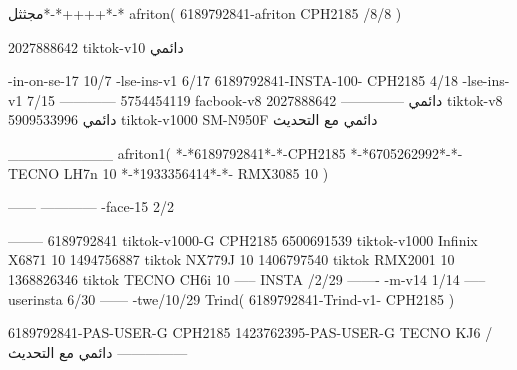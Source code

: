 مجثثل*-*++++*-*
afriton(
6189792841-afriton CPH2185  /8/8
)

2027888642 tiktok-v10
دائمي

-in-on-se-17 10/7
-lse-ins-v1 6/17
6189792841-INSTA-100- CPH2185 4/18
-lse-ins-v1 7/15
------------
5754454119 facbook-v8
دائمي
--------------
2027888642 tiktok-v8
دائمي
5909533996 tiktok-v1000  SM-N950F
دائمي مع التحديث

__________
afriton1(
*-*6189792841*-*-CPH2185
*-*6705262992*-*- TECNO LH7n 10
*-*1933356414*-*- RMX3085 10
)


------
------------
-face-15 2/2

--------
6189792841 tiktok-v1000-G CPH2185 
6500691539 tiktok-v1000    Infinix X6871 10
1494756887 tiktok    NX779J 10
1406797540 tiktok    RMX2001 10
1368826346 tiktok  TECNO CH6i 10
-----
 INSTA /2/29
-------
-m-v14 1/14
-----
userinsta 6/30
------
-twe/10/29
Trind(
6189792841-Trind-v1- CPH2185 
)


6189792841-PAS-USER-G CPH2185 
1423762395-PAS-USER-G TECNO KJ6  /دائمي مع التحديث
    ---------------
